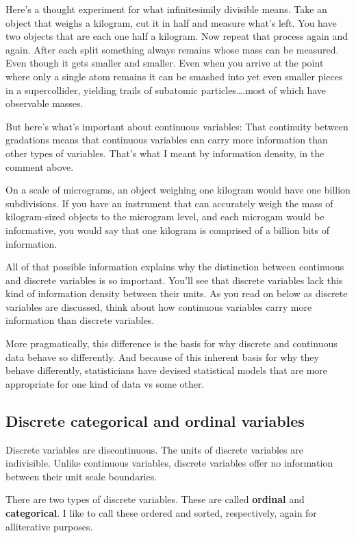 \documentclass[]{book}
\begin{document}
Here's a thought experiment for what infinitesimily divisible means. Take an object that weighs a kilogram, cut it in half and measure what's left. You have two objects that are each one half a kilogram. Now repeat that process again and again. After each split something always remains whose mass can be measured. Even though it gets smaller and smaller. Even when you arrive at the point where only a single atom remains it can be smashed into yet even smaller pieces in a supercollider, yielding trails of subatomic particles\ldots{}.most of which have observable masses.

But here's what's important about continuous variables: That continuity between gradations means that continuous variables can carry more information than other types of variables. That's what I meant by information density, in the comment above.

On a scale of micrograms, an object weighing one kilogram would have one billion subdivisions. If you have an instrument that can accurately weigh the mass of kilogram-sized objects to the microgram level, and each microgam would be informative, you would say that one kilogram is comprised of a billion bits of information.

All of that possible information explains why the distinction between continuous and discrete variables is so important. You'll see that discrete variables lack this kind of information density between their units. As you read on below as discrete variables are discussed, think about how continuous variables carry more information than discrete variables.

More pragmatically, this difference is the basis for why discrete and continuous data behave so differently. And because of this inherent basis for why they behave differently, statisticians have devised statistical models that are more appropriate for one kind of data vs some other.

\hypertarget{discrete-categorical-and-ordinal-variables}{%
\subsection{Discrete categorical and ordinal variables}\label{discrete-categorical-and-ordinal-variables}}

Discrete variables are discontinuous. The units of discrete variables are indivisible. Unlike continuous variables, discrete variables offer no information between their unit scale boundaries.

There are two types of discrete variables. These are called \textbf{ordinal} and \textbf{categorical}. I like to call these ordered and sorted, respectively, again for alliterative purposes.
\end{document}
